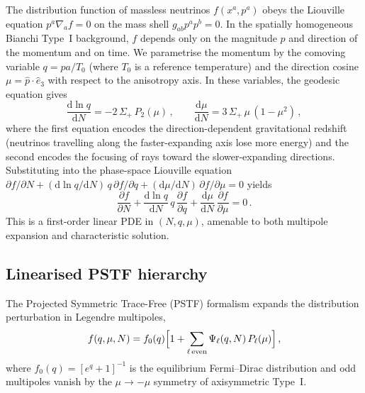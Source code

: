 \documentclass[a4paper,11pt]{article}
\newcommand{\Sig}{\Sigma}
\newcommand{\dd}{\mathrm{d}}
\begin{document}
The distribution function of massless neutrinos $f(x^a, p^a)$ obeys the Liouville equation $p^a\nabla_a f = 0$ on the mass shell $g_{ab}p^a p^b = 0$.  In the spatially homogeneous Bianchi Type~I background, $f$ depends only on the magnitude $p$ and direction of the momentum and on time.  We parametrise the momentum by the comoving variable $q = pa/T_0$ (where $T_0$ is a reference temperature) and the direction cosine $\mu = \hat{p}\cdot\hat{e}_3$ with respect to the anisotropy axis.  In these variables, the geodesic equation gives
\begin{equation}
\frac{\dd\ln q}{\dd N} = -2\,\Sig_+\,P_2(\mu)\,,\qquad
\frac{\dd\mu}{\dd N} = 3\,\Sig_+\,\mu\,(1-\mu^2)\,,\label{eq:geodesic_sources}
\end{equation}
where the first equation encodes the direction-dependent gravitational redshift (neutrinos travelling along the faster-expanding axis lose more energy) and the second encodes the focusing of rays toward the slower-expanding directions.  Substituting into the phase-space Liouville equation $\partial f/\partial N + (\dd\ln q/\dd N)\,q\,\partial f/\partial q + (\dd\mu/\dd N)\,\partial f/\partial\mu = 0$ yields
\begin{equation}
\frac{\partial f}{\partial N} + \frac{\dd\ln q}{\dd N}\,q\,\frac{\partial f}{\partial q} + \frac{\dd\mu}{\dd N}\,\frac{\partial f}{\partial\mu} = 0\,.\label{eq:boltzmann}
\end{equation}
This is a first-order linear PDE in $(N, q, \mu)$, amenable to both multipole expansion and characteristic solution.

\subsection{Linearised PSTF hierarchy}\label{sec:pstf}

The Projected Symmetric Trace-Free (PSTF) formalism expands the distribution perturbation in Legendre multipoles,
\begin{equation}
f(q,\mu,N) = f_0(q)\Bigl[1 + \sum_{\ell\,{\rm even}} \Psi_\ell(q,N)\,P_\ell(\mu)\Bigr]\,,
\end{equation}
where $f_0(q) = [e^q+1]^{-1}$ is the equilibrium Fermi--Dirac distribution and odd multipoles vanish by the $\mu \to -\mu$ symmetry of axisymmetric Type~I.
\end{document}
